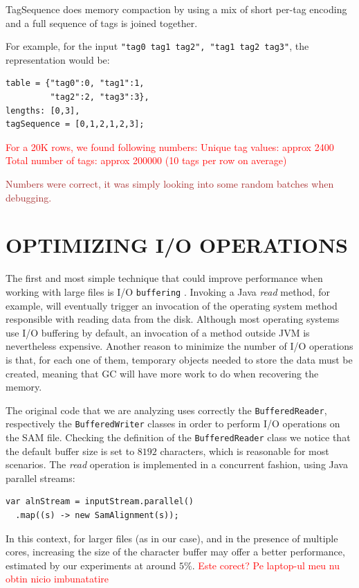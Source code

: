 \documentclass[a4paper,twoside]{article}
\begin{document}
TagSequence does memory compaction by using a mix of short per-tag encoding and a full sequence of tags is joined together.

For example, for the input {\tt "tag0 tag1 tag2", "tag1 tag2 tag3"}, the representation would be:
\begin{verbatim}
table = {"tag0":0, "tag1":1, 
         "tag2":2, "tag3":3},
lengths: [0,3], 
tagSequence = [0,1,2,1,2,3]; 
\end{verbatim}

\textcolor{red}{
For a 20K rows, we found following numbers:
Unique tag values: approx 2400
Total number of tags: approx 200000 (10 tags per row on average)
}

\textcolor{brown}{ Numbers were correct, it was simply looking into some random batches when debugging.
}

\section{\uppercase{Optimizing I/O Operations}}

The first and most simple technique that could improve performance when working with large files
is I/O {\tt buffering} \cite{oaks:2014}. Invoking a Java {\it read} method, for example, will eventually trigger an invocation of the operating system method responsible with reading data from the disk.
Although most operating systems use I/O buffering by default, an invocation of a method outside JVM is nevertheless expensive. Another reason to minimize the number of I/O operations is that, for each one of them, temporary objects needed to store the data must be created, meaning that GC will have more work to do when recovering the memory.

The original code that we are analyzing uses correctly the {\tt BufferedReader}, respectively the {\tt BufferedWriter} classes in order to perform I/O operations on the SAM file.
Checking the definition of the {\tt BufferedReader} class we notice that the default buffer size is set to $8192$ characters, which is reasonable for most scenarios. The {\it read} operation is implemented in a concurrent fashion, using Java parallel streams:
\begin{verbatim}
var alnStream = inputStream.parallel()
  .map((s) -> new SamAlignment(s));
\end{verbatim}
In this context, for larger files (as in our case), and in the presence of multiple cores, increasing the size of the character buffer may offer a better performance, estimated by our experiments at around $5\%$. \textcolor{red}{Este corect? Pe laptop-ul meu nu obtin nicio imbunatatire}
\end{document}
